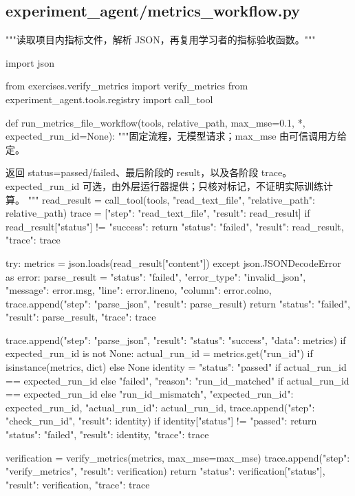 \subsection{experiment\_agent/metrics\_workflow.py}

\begin{Code}
"""读取项目内指标文件，解析 JSON，再复用学习者的指标验收函数。"""

import json

from exercises.verify_metrics import verify_metrics
from experiment_agent.tools.registry import call_tool


def run_metrics_file_workflow(tools, relative_path, max_mse=0.1, *, expected_run_id=None):
    """固定流程，无模型请求；max_mse 由可信调用方给定。

    返回 status=passed/failed、最后阶段的 result，以及各阶段 trace。
    expected_run_id 可选，由外层运行器提供；只核对标记，不证明实际训练计算。
    """
    read_result = call_tool(tools, "read_text_file", {"relative_path": relative_path})
    trace = [{"step": "read_text_file", "result": read_result}]
    if read_result["status"] != "success":
        return {"status": "failed", "result": read_result, "trace": trace}

    try:
        metrics = json.loads(read_result["content"])
    except json.JSONDecodeError as error:
        parse_result = {
            "status": "failed",
            "error_type": "invalid_json",
            "message": error.msg,
            "line": error.lineno,
            "column": error.colno,
        }
        trace.append({"step": "parse_json", "result": parse_result})
        return {"status": "failed", "result": parse_result, "trace": trace}

    trace.append({"step": "parse_json", "result": {"status": "success", "data": metrics}})
    if expected_run_id is not None:
        actual_run_id = metrics.get("run_id") if isinstance(metrics, dict) else None
        identity = {
            "status": "passed" if actual_run_id == expected_run_id else "failed",
            "reason": "run_id_matched" if actual_run_id == expected_run_id else "run_id_mismatch",
            "expected_run_id": expected_run_id,
            "actual_run_id": actual_run_id,
        }
        trace.append({"step": "check_run_id", "result": identity})
        if identity["status"] != "passed":
            return {"status": "failed", "result": identity, "trace": trace}

    verification = verify_metrics(metrics, max_mse=max_mse)
    trace.append({"step": "verify_metrics", "result": verification})
    return {"status": verification["status"], "result": verification, "trace": trace}
\end{Code}


